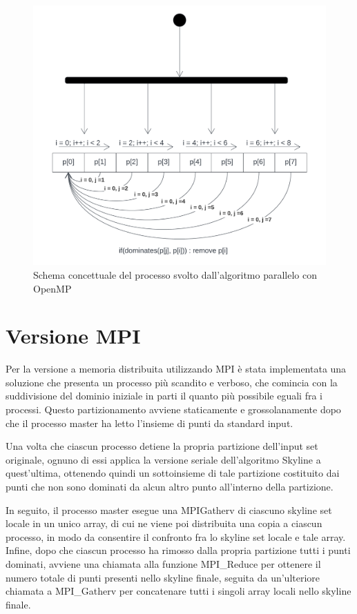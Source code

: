 \documentclass[letterpaper,11pt,leqno]{article}
\begin{document}
\begin{figure}[h]
  \centering
    \includegraphics[scale=0.3]{OMP.pdf}
    \caption{Schema concettuale del processo svolto dall'algoritmo parallelo con OpenMP}
    \label{f:graph1}
\end{figure}







\section{Versione MPI}\label{s:section}

Per la versione a memoria distribuita utilizzando MPI è stata implementata una soluzione che presenta un processo più scandito e verboso, che comincia con la suddivisione del dominio iniziale in parti il quanto più possibile eguali fra i processi. Questo partizionamento avviene staticamente e grossolanamente dopo che il processo master ha letto l'insieme di punti da standard input. 

Una volta che ciascun processo detiene la propria partizione dell'input set originale, ognuno di essi applica la versione seriale dell'algoritmo Skyline a quest'ultima, ottenendo quindi un sottoinsieme di tale partizione costituito dai punti che non sono dominati da alcun altro punto all'interno della partizione. 

In seguito, il processo master esegue una MPIGatherv di ciascuno skyline set locale in un unico array, di cui ne viene poi distribuita una copia a ciascun processo, in modo da consentire il confronto fra lo skyline set locale e tale array. Infine, dopo che ciascun processo ha rimosso dalla propria partizione tutti i punti dominati, avviene una chiamata alla funzione MPI\_Reduce per ottenere il numero totale di punti presenti nello skyline finale, seguita da un'ulteriore chiamata a MPI\_Gatherv per concatenare tutti i singoli array locali nello skyline finale.
\end{document}
